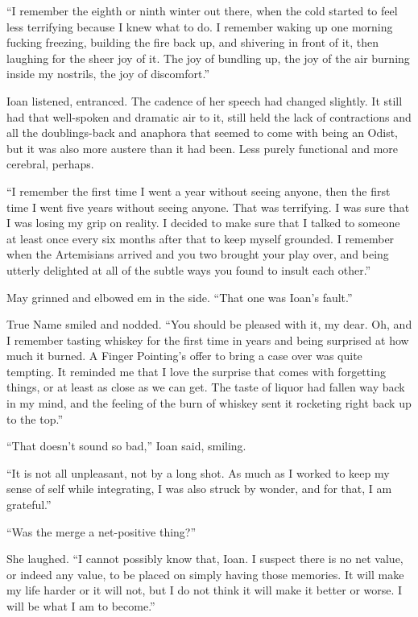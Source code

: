 ``I remember the eighth or ninth winter out there, when the cold started to feel less terrifying because I knew what to do. I remember waking up one morning fucking freezing, building the fire back up, and shivering in front of it, then laughing for the sheer joy of it. The joy of bundling up, the joy of the air burning inside my nostrils, the joy of discomfort.''

Ioan listened, entranced. The cadence of her speech had changed slightly. It still had that well-spoken and dramatic air to it, still held the lack of contractions and all the doublings-back and anaphora that seemed to come with being an Odist, but it was also more austere than it had been. Less purely functional and more cerebral, perhaps.

``I remember the first time I went a year without seeing anyone, then the first time I went five years without seeing anyone. That was terrifying. I was sure that I was losing my grip on reality. I decided to make sure that I talked to someone at least once every six months after that to keep myself grounded. I remember when the Artemisians arrived and you two brought your play over, and being utterly delighted at all of the subtle ways you found to insult each other.''

May grinned and elbowed em in the side. ``That one was Ioan's fault.''

True Name smiled and nodded. ``You should be pleased with it, my dear. Oh, and I remember tasting whiskey for the first time in years and being surprised at how much it burned. A Finger Pointing's offer to bring a case over was quite tempting. It reminded me that I love the surprise that comes with forgetting things, or at least as close as we can get. The taste of liquor had fallen way back in my mind, and the feeling of the burn of whiskey sent it rocketing right back up to the top.''

``That doesn't sound so bad,'' Ioan said, smiling.

``It is not all unpleasant, not by a long shot. As much as I worked to keep my sense of self while integrating, I was also struck by wonder, and for that, I am grateful.''

``Was the merge a net-positive thing?''

She laughed. ``I cannot possibly know that, Ioan. I suspect there is no net value, or indeed any value, to be placed on simply having those memories. It will make my life harder or it will not, but I do not think it will make it better or worse. I will be what I am to become.''

